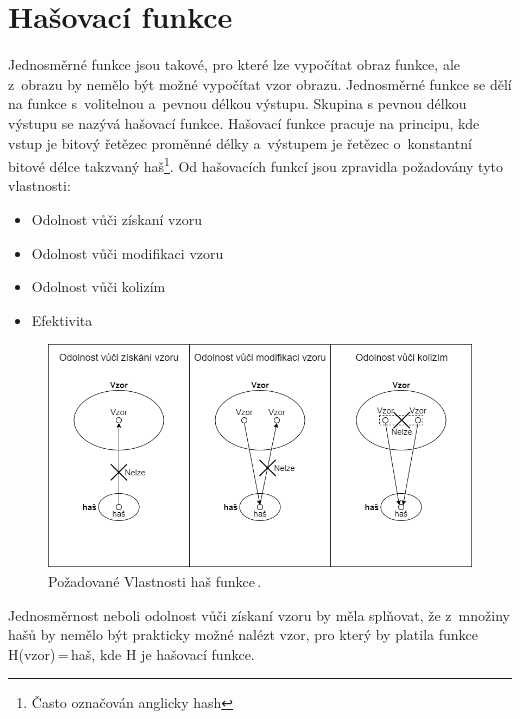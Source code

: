 \section{Hašovací funkce}
\label{sec:hashFunction}
Jednosměrné funkce jsou takové, pro které lze vypočítat obraz funkce, ale z~obrazu by nemělo být možné vypočítat vzor obrazu. Jednosměrné funkce se dělí na funkce s~volitelnou a~pevnou délkou výstupu.\cite{Burda9788021446120ISBN} %
Skupina s pevnou délkou výstupu se nazývá hašovací funkce. Hašovací funkce pracuje na principu, kde vstup je bitový řetězec proměnné délky a~výstupem je řetězec o~konstantní bitové délce takzvaný haš\footnote{Často označován anglicky hash}.\cite{Mao0130669431ISBN}%
\newline
Od hašovacích funkcí jsou zpravidla požadovány tyto vlastnosti:
\begin{itemize}
    \item Odolnost vůči získaní vzoru
    \item Odolnost vůči modifikaci vzoru
    \item Odolnost vůči kolizím
    \item Efektivita
\end{itemize}
\begin{figure}[!h]
  \begin{center}
    \includegraphics[scale=0.4]{obrazky/HashFunction.png}
  \end{center}
  \caption[Požadované vlastnosti haš funkce]{Požadované Vlastnosti haš funkce\,\cite{Burda9788021446120ISBN}.}%
  \label{img:HashFunction}
\end{figure}
Jednosměrnost neboli odolnost vůči získaní vzoru by měla splňovat, že z~množiny hašů by nemělo být prakticky možné nalézt vzor, pro který by platila funkce H(vzor)\,=\,haš, kde H je hašovací funkce.


